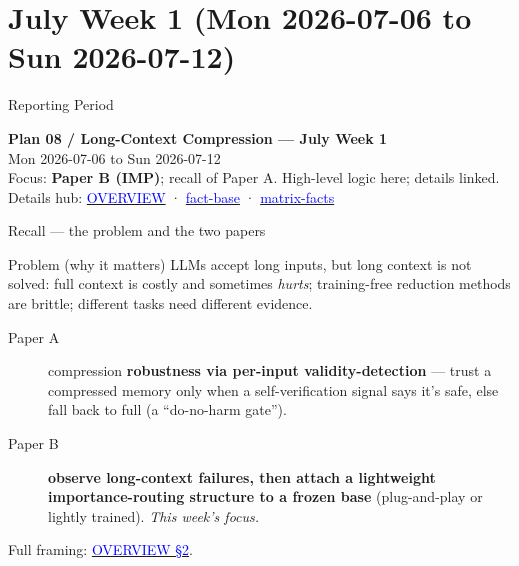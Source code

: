
\providecommand{\pbref}[2]{\href{../../papers/paper-b-forgetting-gating/#1}{\textcolor{blue}{#2}}}

\section{July Week 1 (Mon 2026-07-06 to Sun 2026-07-12)}

\begin{frame}{Reporting Period}
  \begin{center}
    \textbf{Plan 08 / Long-Context Compression --- July Week 1} \\[0.3em]
    \small Mon 2026-07-06 to Sun 2026-07-12 \\
    \scriptsize Focus: \textbf{Paper B (IMP)}; recall of Paper A. High-level logic here; details linked. \\
    \scriptsize Details hub: \pbref{OVERVIEW-both-papers-and-facts.md}{OVERVIEW} · \pbref{baseline-factbase-v2.0.0.md}{fact-base} · \pbref{matrix-facts.md}{matrix-facts}
  \end{center}
\end{frame}

\begin{frame}{Recall --- the problem and the two papers}
  \small
  \begin{block}{Problem (why it matters)}
    LLMs accept long inputs, but long context is not solved: full context is costly and sometimes \emph{hurts}; training-free reduction methods are brittle; different tasks need different evidence.
  \end{block}
  \begin{description}
    \item[Paper A] compression \textbf{robustness via per-input validity-detection} — trust a compressed memory only when a self-verification signal says it's safe, else fall back to full (a ``do-no-harm gate'').
    \item[Paper B] \textbf{observe long-context failures, then attach a lightweight importance-routing structure to a frozen base} (plug-and-play or lightly trained). \emph{This week's focus.}
  \end{description}
  \scriptsize Full framing: \pbref{OVERVIEW-both-papers-and-facts.md}{OVERVIEW §2}.
\end{frame}

